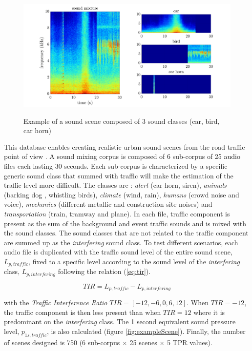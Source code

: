 \documentclass[twocolumn,a4paper,10pt]{article}
\begin{document}
\begin{figure}[t]
\centering
\includegraphics[width=\linewidth]{../image/exampleSimScene2.pdf}
\label{fig:exampleSimScene}
\caption{Example of a sound scene composed of 3 sound classes (car, bird, car horn)}
\end{figure}

This database enables creating realistic urban sound scenes from the road traffic point of view \cite{gloaguen_creation_2017}. A sound mixing corpus is composed of 6 sub-corpus of 25 audio files each lasting 30 seconds. Each sub-corpus is characterized by a specific generic sound class that summed with traffic will make the estimation of the traffic level more difficult. The classes are : \textit{alert} (car horn, siren), \textit{animals} (barking dog , whistling birds), \textit{climate} (wind, rain), \textit{humans} (crowd noise and voice), \textit{mechanics} (different metallic and construction site noises) and \textit{transportation} (train, tramway and plane). In each file, traffic component is present as the sum of the background and event traffic sounds and is mixed with the sound classes. The sound classes that are not related to the traffic component are summed up as the \textit{interfering} sound class. To test different scenarios, each audio file is duplicated with the traffic sound level of the entire sound scene, $L_{p,traffic}$, fixed to a specific level according to the sound level of the \textit{interfering} class, $L_{p,interfering}$ following the relation (\ref{eq:tir}).

\begin{equation}\label{eq:tir}
TIR = L_{p,traffic}-L_{p,interfering}
\end{equation}

with the \textit{Traffic Interference Ratio} $TIR = \left[-12, -6, 0, 6, 12\right]$. When $TIR = -12$, the traffic component is then less present than when $TIR = 12$ where it is predominant on the \textit{interfering} class. The 1 second equivalent sound pressure level, $p_{1s,traffic}$, is also calculated (figure \ref{fig:exampleScene}). Finally, the number of scenes designed is 750 (6 sub-corpus $\times$ 25 scenes $\times$  5 TPR values).
\end{document}
